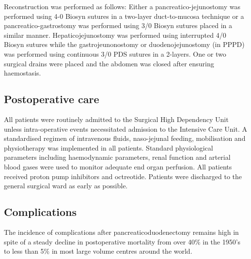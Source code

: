 Reconstruction was performed as follows: Either a pancreatico-jejunostomy was performed using 4-0 Biosyn sutures in a two-layer duct-to-mucosa technique or a pancreatico-gastrostomy was performed using 3/0 Biosyn sutures placed in a similar manner. Hepaticojejunostomy was performed using interrupted 4/0 Biosyn sutures while the gastrojeunonostomy or duodenojejunostomy (in PPPD) was performed using continuous 3/0 PDS sutures in a 2-layers. One or two surgical drains were placed and the abdomen was closed after ensuring haemostasis.

\subsection{Postoperative care}
All patients were routinely admitted to the Surgical High Dependency Unit unless intra-operative events necessitated admission to the Intensive Care Unit. A standardised regimen of intravenous fluids, naso-jejunal feeding, mobilisation and physiotherapy was implemented in all patients. Standard physiological parameters including haemodynamic parameters, renal function and arterial blood gases were used to monitor adequate end organ perfusion. All patients received proton pump inhibitors and octreotide. Patients were discharged to the general surgical ward as early as possible.

\subsection{Complications}
The incidence of complications after pancreaticoduodenectomy remains high in spite of a steady decline in postoperative mortality from over 40\% in the 1950's to less than 5\% in most large volume centres around the world.\parencite{deoliveira_assessment_2006,emick_hospital_2006,yeo_six_1997, winter_1423_2006,teh_patient_2009,gouma_rates_2000}

